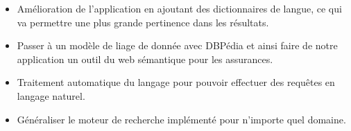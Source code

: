 \documentclass[12pt, a4paper, oneside]{book}
\begin{document}
\begin{itemize}

\item Amélioration de l’application en ajoutant des dictionnaires de langue, ce qui va permettre
une plus grande pertinence dans les résultats.\\

\item Passer à un modèle de liage de donnée avec DBPédia et ainsi faire de notre application un
outil du web sémantique pour les assurances.\\

\item Traitement automatique du langage pour pouvoir effectuer des requêtes en langage naturel.\\

\item Généraliser le moteur de recherche implémenté pour n'importe quel domaine.\\

\end{itemize}







\end{document}

